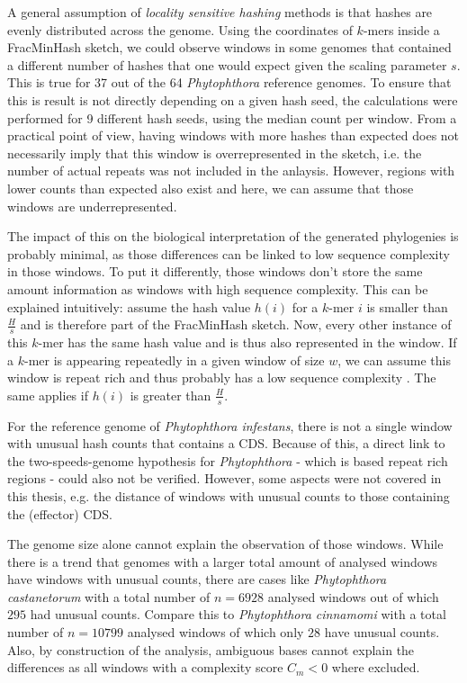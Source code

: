 A general assumption of \textit{locality sensitive hashing} methods is that
hashes are evenly distributed across the genome. Using the coordinates of
$k$-mers inside a FracMinHash sketch, we could observe windows in some genomes
that contained a different number of hashes that one would expect given the
scaling parameter $s$. This is true for 37 out of the 64 \textit{Phytophthora}
reference genomes. To ensure that this is result is not directly depending on a
given hash seed, the calculations were performed for 9 different hash seeds,
using the median count per window. From a practical point of view, having
windows with more hashes than expected does not necessarily imply that this
window is overrepresented in the sketch, i.e. the number of actual repeats was
not included in the anlaysis. However, regions with lower counts than expected
also exist and here, we can assume that those windows are underrepresented.

The impact of this on the biological interpretation of the generated phylogenies
is probably minimal, as those differences can be linked to low sequence
complexity in those windows. To put it differently, those windows don't store
the same amount information as windows with high sequence complexity. This can
be explained intuitively: assume the hash value $h(i)$ for a $k$-mer $i$ is
smaller than $\frac{H}{s}$ and is therefore part of the FracMinHash sketch. Now,
every other instance of this $k$-mer has the same hash value and is thus also
represented in the window. If a $k$-mer is appearing repeatedly in a given
window of size $w$, we can assume this window is repeat rich and thus probably
has a low sequence complexity \cite{pirogovHighcomplexityRegionsMammalian2019}.
The same applies if $h(i)$ is greater than $\frac{H}{s}$.

For the reference genome of \textit{Phytophthora infestans}, there is not a
single window with unusual hash counts that contains a CDS. Because of this, a
direct link to the two-speeds-genome hypothesis for \textit{Phytophthora} -
which is based repeat rich regions - could also not be verified. However, some
aspects were not covered in this thesis, e.g. the distance of windows with
unusual counts to those containing the (effector) CDS.

The genome size alone cannot explain the observation of those windows. While
there is a trend that genomes with a larger total amount of analysed windows
have windows with unusual counts, there are cases like \textit{Phytophthora
castanetorum} with a total number of $n=6928$ analysed windows out of which
$295$ had unusual counts. Compare this to \textit{Phytophthora cinnamomi} with a
total number of $n=10799$ analysed windows of which only $28$ have unusual
counts. Also, by construction of the analysis, ambiguous bases cannot explain
the differences as all windows with a complexity score $C_m < 0$ where excluded. 

